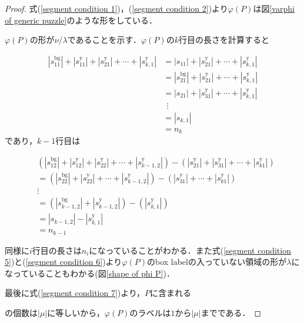 \begin{proof}
  式(\ref{segment condition 1})，(\ref{segment condition 2})より$\varphi(P)$は図\ref{varphi of generic puzzle}のような形をしている．
  

  $\varphi(P)$の形が$\nu/\lambda$であることを示す．$\varphi(P)$の$k$行目の長さを計算すると

  \begin{align*}
    |s_{11}^{\text{bg}}| + |s_{11}^{\text{y}}| + |s_{21}^{\text{y}}| + \cdots + |s_{k,1}^{\text{y}}|
    &=|s_{11}| + |s_{21}^{\text{y}}| + \cdots + |s_{k,1}^{\text{y}}|\\
    &=|s_{21}^{\text{bg}}| + |s_{21}^{\text{y}}| + \cdots + |s_{k,1}^{\text{y}}|\\
    &=|s_{21}| + |s_{31}^{\text{y}}| + \cdots + |s_{k,1}^{\text{y}}|\\
    &\:\:\vdots\\
    &=|s_{k,1}|\\
    &=n_k
  \end{align*}
  であり，$k-1$行目は

  \begin{align*}
    &(|s_{12}^{\text{bg}}| + |s_{12}^{\text{y}}| + |s_{22}^{\text{y}}| + \cdots + |s_{k-1,2}^{\text{y}}|)
    - (|s_{21}^{\text{y}}|+|s_{31}^{\text{y}}|+\cdots+|s_{k1}^{\text{y}}|)\\
    &=(|s_{22}^{\text{bg}}| + |s_{22}^{\text{y}}| + \cdots + |s_{k-1,2}^{\text{y}}|) - (|s_{31}^{\text{y}}|+\cdots+|s_{k1}^{\text{y}}|)\\
    &\vdots\\
    &=(|s_{k-1,2}^{\text{bg}}|+|s_{k-1,2}^{\text{y}}|)-(|s_{k,1}^{\text{y}}|)\\
    &=|s_{k-1,2}| - |s_{k,1}^{\text{y}}|\\
    &=n_{k-1}
  \end{align*}

  同様に$i$行目の長さは$n_{i}$になっていることがわかる．また式(\ref{segment condition 5})と(\ref{segment condition 6})より$\varphi(P)$のbox labelの入っていない領域の形が$\lambda$になっていることもわかる(図\ref{shape of phi P})．
  

  最後に式(\ref{segment condition 7})より，$P$に含まれる
  の個数は$|\mu|$に等しいから，$\varphi(P)$のラベルは$1$から$|\mu|$までである．
\end{proof}

